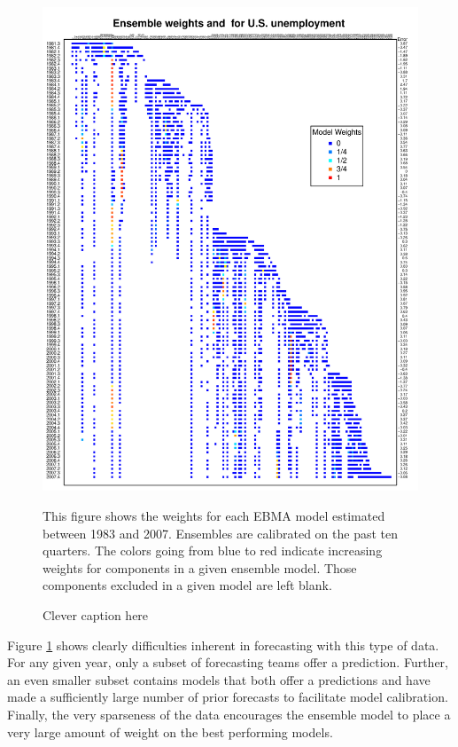 \documentclass[12pt,fullpage,endnotes]{article}
\begin{document}
\begin{figure}[h]
\caption{Clever caption here}
\label{modelWeights}
\begin{center}
\includegraphics[scale=.95]{awesome}
\end{center}

\footnotesize This figure shows the weights for each EBMA model estimated between 1983 and 2007. Ensembles are calibrated on the past ten quarters. The colors going from blue to red indicate increasing weights for components in a given ensemble model. Those components excluded in a given model are left blank.

\end{figure}

Figure \ref{modelWeights} shows clearly difficulties inherent in
forecasting with this type of data.  For any given year, only a subset
of forecasting teams offer a prediction.  Further, an even smaller
subset contains models that both offer a predictions and have made a sufficiently large
number of prior forecasts to facilitate model calibration.  Finally,
the very sparseness of the data encourages the ensemble model to place a very
large amount of weight on the best performing models.
\end{document}
